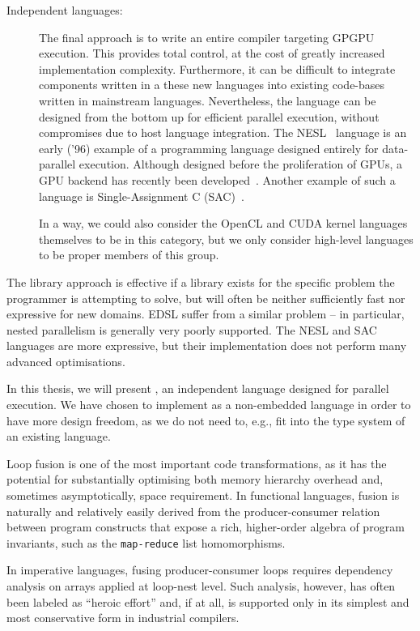 \begin{description}
\begin{description}
\item[Independent languages:] The final approach is to write an entire
  compiler targeting GPGPU execution.  This provides total control, at
  the cost of greatly increased implementation complexity.
  Furthermore, it can be difficult to integrate components written in
  a these new languages into existing code-bases written in mainstream
  languages.  Nevertheless, the language can be designed from the
  bottom up for efficient parallel execution, without compromises due
  to host language integration.  The NESL~\cite{BlellochCACM96NESL}
  language is an early ('96) example of a programming language
  designed entirely for data-parallel execution.  Although designed
  before the proliferation of GPUs, a GPU backend has recently been
  developed~\cite{bergstrom2012nested}.  Another example of such a
  language is Single-Assignment C (SAC)~\cite{grelck2006sac}.

  In a way, we could also consider the OpenCL and CUDA kernel
  languages themselves to be in this category, but we only consider
  high-level languages to be proper members of this group.
\end{description}
\end{description}

The library approach is effective if a library exists for the specific
problem the programmer is attempting to solve, but will often be
neither sufficiently fast nor expressive for new domains.  EDSL suffer
from a similar problem -- in particular, nested parallelism is
generally very poorly supported.  The NESL and SAC languages are more
expressive, but their implementation does not perform many advanced
optimisations.

In this thesis, we will present \LO{}, an independent language
designed for parallel execution.  We have chosen to implement \LO{} as
a non-embedded language in order to have more design freedom, as we do
not need to, e.g., fit \LO{} into the type system of an existing
language.

Loop fusion is one of the most important code transformations, as it
has the potential for substantially optimising both memory hierarchy
overhead and, sometimes asymptotically, space requirement.  In
functional languages, fusion is naturally and relatively easily
derived from the producer-consumer relation between program constructs
that expose a rich, higher-order algebra of program invariants, such
as the \texttt{map-reduce} list homomorphisms.

In imperative languages, fusing producer-consumer loops requires
dependency analysis on arrays applied at loop-nest level.  Such
analysis, however, has often been labeled as ``heroic effort'' and, if
at all, is supported only in its simplest and most conservative form
in industrial compilers.

